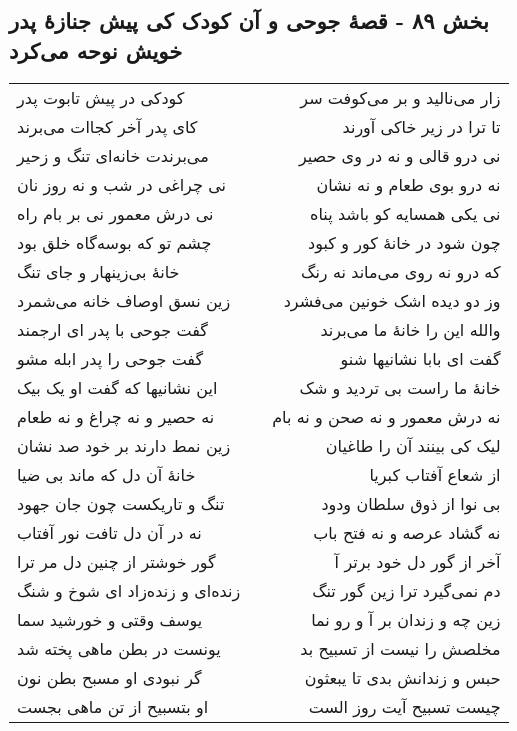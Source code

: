 \begin{center}
\section*{بخش ۸۹ - قصهٔ جوحی و آن کودک کی پیش جنازهٔ پدر خویش نوحه می‌کرد}
\label{sec:sh089}
\begin{longtable}{l p{0.5cm} r}
کودکی در پیش تابوت پدر
&&
زار می‌نالید و بر می‌کوفت سر
\\
کای پدر آخر کجاات می‌برند
&&
تا ترا در زیر خاکی آورند
\\
می‌برندت خانه‌ای تنگ و زحیر
&&
نی درو قالی و نه در وی حصیر
\\
نی چراغی در شب و نه روز نان
&&
نه درو بوی طعام و نه نشان
\\
نی درش معمور نی بر بام راه
&&
نی یکی همسایه کو باشد پناه
\\
چشم تو که بوسه‌گاه خلق بود
&&
چون شود در خانهٔ کور و کبود
\\
خانهٔ بی‌زینهار و جای تنگ
&&
که درو نه روی می‌ماند نه رنگ
\\
زین نسق اوصاف خانه می‌شمرد
&&
وز دو دیده اشک خونین می‌فشرد
\\
گفت جوحی با پدر ای ارجمند
&&
والله این را خانهٔ ما می‌برند
\\
گفت جوحی را پدر ابله مشو
&&
گفت ای بابا نشانیها شنو
\\
این نشانیها که گفت او یک بیک
&&
خانهٔ ما راست بی تردید و شک
\\
نه حصیر و نه چراغ و نه طعام
&&
نه درش معمور و نه صحن و نه بام
\\
زین نمط دارند بر خود صد نشان
&&
لیک کی بینند آن را طاغیان
\\
خانهٔ آن دل که ماند بی ضیا
&&
از شعاع آفتاب کبریا
\\
تنگ و تاریکست چون جان جهود
&&
بی نوا از ذوق سلطان ودود
\\
نه در آن دل تافت نور آفتاب
&&
نه گشاد عرصه و نه فتح باب
\\
گور خوشتر از چنین دل مر ترا
&&
آخر از گور دل خود برتر آ
\\
زنده‌ای و زنده‌زاد ای شوخ و شنگ
&&
دم نمی‌گیرد ترا زین گور تنگ
\\
یوسف وقتی و خورشید سما
&&
زین چه و زندان بر آ و رو نما
\\
یونست در بطن ماهی پخته شد
&&
مخلصش را نیست از تسبیح بد
\\
گر نبودی او مسبح بطن نون
&&
حبس و زندانش بدی تا یبعثون
\\
او بتسبیح از تن ماهی بجست
&&
چیست تسبیح آیت روز الست
\\

\end{longtable}
\end{center}
